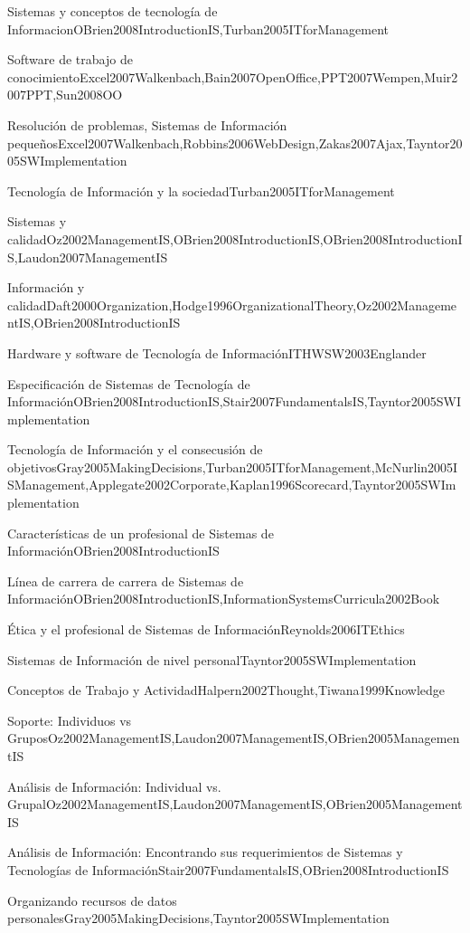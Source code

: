 \begin{LU1}{Sistemas y conceptos de tecnología de Informacion}{OBrien2008IntroductionIS,Turban2005ITforManagement}{}
\begin{LU2}{Software de trabajo de conocimiento}{Excel2007Walkenbach,Bain2007OpenOffice,PPT2007Wempen,Muir2007PPT,Sun2008OO}{}
\begin{LU3}{Resolución de problemas, Sistemas de Información pequeños}{Excel2007Walkenbach,Robbins2006WebDesign,Zakas2007Ajax,Tayntor2005SWImplementation}{}
\begin{LU4}{Tecnología de Información y la sociedad}{Turban2005ITforManagement}{}
\begin{LU5}{Sistemas y calidad}{Oz2002ManagementIS,OBrien2008IntroductionIS,OBrien2008IntroductionIS,Laudon2007ManagementIS}{}
\begin{LU6}{Información y calidad}{Daft2000Organization,Hodge1996OrganizationalTheory,Oz2002ManagementIS,OBrien2008IntroductionIS}{}
\begin{LU7}{Hardware y software de Tecnología de Información}{ITHWSW2003Englander}{}
\begin{LU8}{Especificación de Sistemas de Tecnología de Información}{OBrien2008IntroductionIS,Stair2007FundamentalsIS,Tayntor2005SWImplementation}{}
\begin{LU9}{Tecnología de Información y el consecusión de objetivos}{Gray2005MakingDecisions,Turban2005ITforManagement,McNurlin2005ISManagement,Applegate2002Corporate,Kaplan1996Scorecard,Tayntor2005SWImplementation}{}
\begin{LU10}{Características de un profesional de Sistemas de Información}{OBrien2008IntroductionIS}{}
\begin{LU11}{Línea de carrera de carrera de Sistemas de Información}{OBrien2008IntroductionIS,InformationSystemsCurricula2002Book}{}
\begin{LU12}{Ética y el profesional de Sistemas de Información}{Reynolds2006ITEthics}{}
\begin{LU13}{Sistemas de Información de nivel personal}{Tayntor2005SWImplementation}{}
\begin{LU13.01}[LU13]{Conceptos de Trabajo y Actividad}{Halpern2002Thought,Tiwana1999Knowledge}{}
\begin{LU13.02}[LU13]{Soporte: Individuos vs Grupos}{Oz2002ManagementIS,Laudon2007ManagementIS,OBrien2005ManagementIS}{}
\begin{LU13.03}[LU13]{Análisis de Información: Individual vs. Grupal}{Oz2002ManagementIS,Laudon2007ManagementIS,OBrien2005ManagementIS}{}
\begin{LU13.04}[LU13]{Análisis de Información: Encontrando sus requerimientos de Sistemas y Tecnologías de Información}{Stair2007FundamentalsIS,OBrien2008IntroductionIS}{}
\begin{LU13.05}[LU13]{Organizando recursos de datos personales}{Gray2005MakingDecisions,Tayntor2005SWImplementation}{}
\end{LU13.05}
\end{LU13.04}
\end{LU13.03}
\end{LU13.02}
\end{LU13.01}
\end{LU13}
\end{LU12}
\end{LU11}
\end{LU10}
\end{LU9}
\end{LU8}
\end{LU7}
\end{LU6}
\end{LU5}
\end{LU4}
\end{LU3}
\end{LU2}
\end{LU1}
